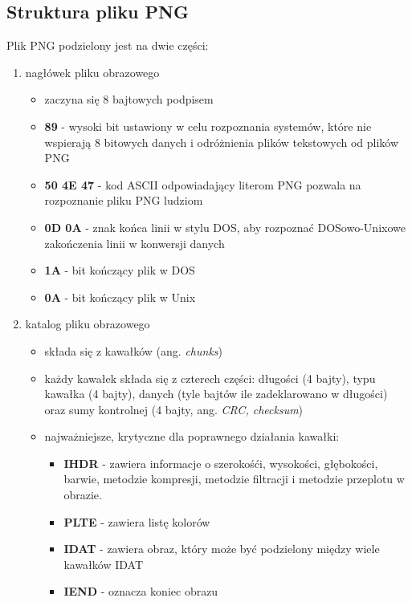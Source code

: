 \documentclass[a4paper,12pt, titlepage]{report}
\begin{document}
\subsection*{Struktura pliku PNG}
\par Plik PNG podzielony jest na dwie części:
\begin{enumerate}
\item nagłówek pliku obrazowego
\begin{itemize}
\item zaczyna się 8 bajtowych podpisem
\item \textbf{89} - wysoki bit ustawiony w celu rozpoznania systemów, które nie wspierają 8 bitowych danych i odróżnienia plików tekstowych od plików PNG
\item \textbf{50 4E 47} - kod ASCII odpowiadający literom PNG pozwala na rozpoznanie pliku PNG ludziom
\item \textbf{0D 0A} - znak końca linii w stylu DOS, aby rozpoznać DOSowo-Unixowe zakończenia linii w konwersji danych
\item \textbf{1A} - bit kończący plik w DOS
\item \textbf{0A} - bit kończący plik w Unix
\end{itemize}
\item katalog pliku obrazowego
\begin{itemize}
\item składa się z kawałków (ang. \textit{chunks})
\item każdy kawałek składa się z czterech części: długości (4 bajty), typu kawałka (4 bajty), danych (tyle bajtów ile zadeklarowano w długości) oraz sumy kontrolnej (4 bajty, ang. \textit{CRC, checksum})
\item najważniejsze, krytyczne dla poprawnego działania kawałki:
\begin{itemize}
\item \textbf{IHDR} - zawiera informacje o szerokośći, wysokości, głębokości, barwie, metodzie kompresji, metodzie filtracji i metodzie przeplotu w obrazie.
\item \textbf{PLTE} - zawiera listę kolorów
\item \textbf{IDAT} - zawiera obraz, który może być podzielony między wiele kawałków IDAT
\item \textbf{IEND} - oznacza koniec obrazu
\end{itemize}
\end{itemize}
\end{enumerate}
\end{document}
